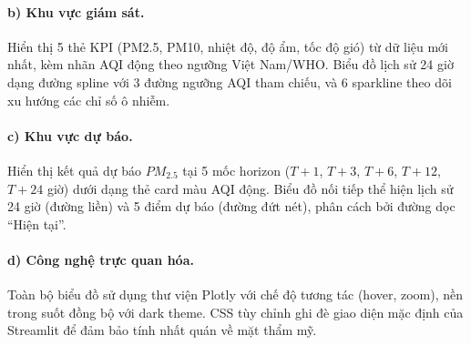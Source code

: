 \paragraph{b) Khu vực giám sát.} Hiển thị 5 thẻ KPI (PM2.5, PM10, nhiệt độ, độ ẩm, tốc độ gió) từ dữ liệu mới nhất, kèm nhãn AQI động theo ngưỡng Việt Nam/WHO. Biểu đồ lịch sử 24 giờ dạng đường spline với 3 đường ngưỡng AQI tham chiếu, và 6 sparkline theo dõi xu hướng các chỉ số ô nhiễm.

\paragraph{c) Khu vực dự báo.} Hiển thị kết quả dự báo $PM_{2.5}$ tại 5 mốc horizon ($T+1$, $T+3$, $T+6$, $T+12$, $T+24$ giờ) dưới dạng thẻ card màu AQI động. Biểu đồ nối tiếp thể hiện lịch sử 24 giờ (đường liền) và 5 điểm dự báo (đường đứt nét), phân cách bởi đường dọc ``Hiện tại''.

\paragraph{d) Công nghệ trực quan hóa.} Toàn bộ biểu đồ sử dụng thư viện Plotly với chế độ tương tác (hover, zoom), nền trong suốt đồng bộ với dark theme. CSS tùy chỉnh ghi đè giao diện mặc định của Streamlit để đảm bảo tính nhất quán về mặt thẩm mỹ.

